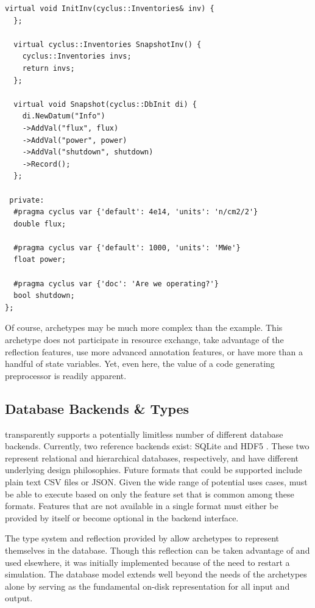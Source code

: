 \begin{lstlisting}[caption={Simple Reactor Archetype After Preprocessing with \cycpp, 
                            line marker directives have been removed for space}, 
                   label=rx-eg-cycpp]
  virtual void InitInv(cyclus::Inventories& inv) {
  };

  virtual cyclus::Inventories SnapshotInv() {
    cyclus::Inventories invs;
    return invs;
  };

  virtual void Snapshot(cyclus::DbInit di) {
    di.NewDatum("Info")
    ->AddVal("flux", flux)
    ->AddVal("power", power)
    ->AddVal("shutdown", shutdown)
    ->Record();
  };

 private:
  #pragma cyclus var {'default': 4e14, 'units': 'n/cm2/2'}
  double flux;

  #pragma cyclus var {'default': 1000, 'units': 'MWe'}
  float power;

  #pragma cyclus var {'doc': 'Are we operating?'}
  bool shutdown;
};
\end{lstlisting}

Of course, archetypes may be much more complex than the  example.
This archetype does not participate in resource exchange, take advantage of 
the reflection features, use more advanced annotation features, or have more than 
a handful of state variables.  Yet, even here, the value of a code generating
preprocessor is readily apparent.

\subsection{Database Backends \& Types}

\Cyclus transparently supports a potentially limitless number of different database 
backends. Currently, two reference backends exist: \gls{SQLite} \cite{owens2006definitive} 
and \gls{HDF5} \cite{folk2011overview}. These two represent relational and hierarchical 
databases, respectively, and have different underlying design philosophies.
Future formats that could be supported include plain text 
\gls{CSV} files or \gls{JSON}.  Given the wide range of potential uses cases, \cyclus must be able 
to execute based on only the feature set that is common among these formats.
Features that are not available in a single format must either be provided by \cyclus 
itself or become optional in the backend interface.

The type system and reflection provided by \cycpp 
allow archetypes to represent themselves in the database. Though this 
reflection can be taken advantage of and used elsewhere, it was initially
implemented because of the need to restart a simulation.
The database model extends well beyond the needs of the archetypes alone by 
serving as the fundamental on-disk representation for all \cyclus input and output.


